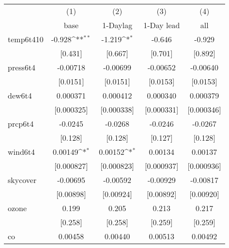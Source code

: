 {
\def\sym#1{\ifmmode^{#1}\else\(^{#1}\)\fi}
\begin{tabular}{l*{4}{c}}
\hline\hline
            &\multicolumn{1}{c}{(1)}&\multicolumn{1}{c}{(2)}&\multicolumn{1}{c}{(3)}&\multicolumn{1}{c}{(4)}\\
            &\multicolumn{1}{c}{base}&\multicolumn{1}{c}{1-Daylag}&\multicolumn{1}{c}{1-Day lead}&\multicolumn{1}{c}{all}\\
\hline
temp6t410   &      -0.928\sym{**} &      -1.219\sym{*}  &      -0.646         &      -0.929         \\
            &     [0.431]         &     [0.667]         &     [0.701]         &     [0.892]         \\
[1em]
press6t4    &    -0.00718         &    -0.00699         &    -0.00652         &    -0.00640         \\
            &    [0.0151]         &    [0.0151]         &    [0.0153]         &    [0.0153]         \\
[1em]
dew6t4      &    0.000371         &    0.000412         &    0.000340         &    0.000379         \\
            &  [0.000325]         &  [0.000338]         &  [0.000331]         &  [0.000346]         \\
[1em]
prcp6t4     &     -0.0245         &     -0.0268         &     -0.0246         &     -0.0267         \\
            &     [0.128]         &     [0.128]         &     [0.127]         &     [0.128]         \\
[1em]
wind6t4     &     0.00149\sym{*}  &     0.00152\sym{*}  &     0.00134         &     0.00137         \\
            &  [0.000827]         &  [0.000823]         &  [0.000937]         &  [0.000936]         \\
[1em]
skycover    &    -0.00695         &    -0.00592         &    -0.00929         &    -0.00817         \\
            &   [0.00898]         &   [0.00924]         &   [0.00892]         &   [0.00920]         \\
[1em]
ozone       &       0.199         &       0.205         &       0.213         &       0.217         \\
            &     [0.258]         &     [0.258]         &     [0.259]         &     [0.259]         \\
[1em]
co          &     0.00458         &     0.00440         &     0.00513         &     0.00492         \\

\end{tabular}}

